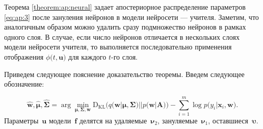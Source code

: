 Теорема \ref{theorem:ap:neural} задает апостериорное распределение параметров \eqref{eq:ap:3} после зануления нейронов в модели нейросети --- учителя. Заметим, что аналогичным образом можно удалить сразу подмножество нейронов в рамках одного слоя. В случае, если число нейронов отличается в нескольких слоях модели нейросети учителя, то выполняется последовательно применения отображения $\phi\bigr(t, \mathbf{u}\bigr)$ для каждого $t$-го слоя.


Приведем следующее пояснение доказательство теоремы. Введем следующее обозначение:

\[
\hat{\mathbf{w}}, \hat{\bm{\mu}}, \hat{\bm{\Sigma}} = \arg \min_{\bm{\mu}, \bm{\Sigma}, \mathbf{w}} \text{D}_{\text{KL}}\bigr(q\bigr(\mathbf{w}|\bm{\mu}, \bm{\Sigma}\bigr)||p\bigr(\mathbf{w}|\mathbf{A}\bigr)\bigr) - \sum_{i=1}^{m}\log p\bigr(y_i|\mathbf{x}_{i}, \mathbf{w}\bigr).
\]
Параметры~$\mathbf{u}$ модели~$\mathbf{f}$ делятся на {\color{red} удаляемые~$\bm{\nu}_2$}, {\color{blue} зануляемые~$\bm{\nu}_1$}, {оставшиеся~$\bm{\upsilon}$}.

